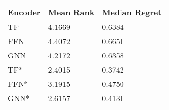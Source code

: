 \begin{tabular}{lll}
\toprule
Encoder & Mean Rank & Median Regret \\
\midrule
TF & 4.1669 & 0.6384 \\
FFN & 4.4072 & 0.6651 \\
GNN & 4.2172 & 0.6358 \\
TF* & 2.4015 & 0.3742 \\
FFN* & 3.1915 & 0.4750 \\
GNN* & 2.6157 & 0.4131 \\
\bottomrule
\end{tabular}
